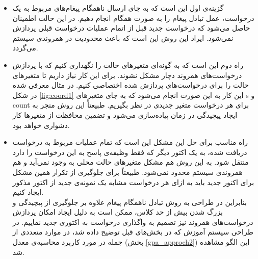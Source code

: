 \begin{itemize}
\item گزینه‌ی اول این است که به جای ارسال ناهمگام پیغام‌های مربوط به یک درخواست، عمل تبادل پیغام را به صورت همگام انجام دهیم. در این حالت اطمینان حاصل می‌شود که درخواست جدید قبل از اتمام عملیات درخواست قبلی پردازش نمی‌شود. ایراد این روش این است که باعث محدودیت در همروندی سیستم می‌گردد.
\item راه دوم این است که به گونه‌ای متغیرهای حالت را نگهداری کنیم که با پردازش درخواست‌های همروند دچار مشکل نشوند. برای این کار نیاز داریم تا متغیرهای حالت را برای درخواست‌های پردازش شده اختصاصی کنیم. در مثال معرفی شده در  شکل \ref{fig:coord1} این کار به این صورت انجام می‌شود که به جای متغیر‌های s و count برای هر درخواست متغیر جدیدی در نظر بگیریم. طبیعتاً این روش منجر به ایجاد پیچیدگی در زمان پیاده‌سازی می‌شود و تضمین محافظت از متغیرها کار دشواری خواهد بود.
\item
 راه مناسب برای حل این مشکل این است که تمام عملیات مربوط به درخواست دریافت شده، به یک اکتور دیگر که فقط وظیفه‌ی پاسخ به این درخواست را دارد منتقل شود. به این روش هم مشکل متغیر‌های حالت محلی به وجود نمی‌آید و هم همروندی سیستم محدود نمی‌شود. طبیعتاً برای جلوگیری از تکرار همین مشکل برای اکتور جدید باید به ازای هر درخواست مشابه یک نمونه‌ی جدید از اکتور مذکور ایجاد کنیم.\\
بنابراین در طراحی به روش تبادل ناهمگام پیغام علاوه‌ بر جلوگیری از پیچیدگی و بزرگ شدن بیش از حد کلاس، ممکن است به دلیل ایجاد امکان پردازش درخواست‌های همروند نیز تصمیم به واگذاری درخواست به اکتوری جدید نماییم.
 در طراحی سیستم آموزش که در بخش‌های قبل توضیح داده شد، در موارد متعددی از جمله در مورد کاربرد محاسبه‌ی معدل (بخش \ref{gpa_approch2}) این الگو مشاهده شد.

\end{itemize}
